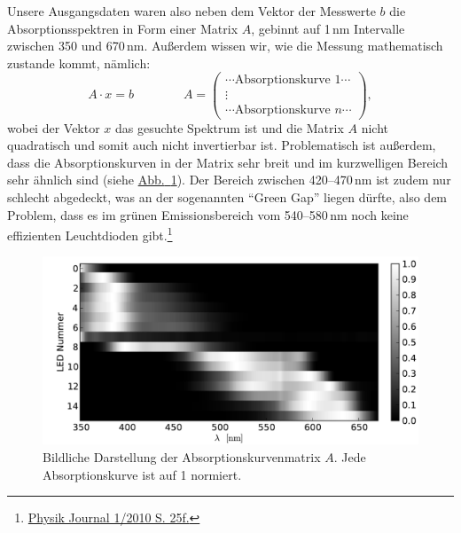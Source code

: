\documentclass[11pt]{scrartcl}
\newcommand{\hypref}[2]{\hyperref[#2]{{#1}~\ref{#2}}}
\begin{document}
Unsere Ausgangsdaten waren also neben dem Vektor der Messwerte $b$ die Absorptionsspektren in Form einer Matrix $A$, gebinnt auf 1\,nm Intervalle zwischen 350 und 670\,nm. Außerdem wissen wir, wie die Messung mathematisch zustande kommt, nämlich:
\begin{equation}
A\cdot x = b
\qquad\qquad
A =
\begin{pmatrix}
\cdots \text{Absorptionskurve 1} \cdots \\
\vdots \\
\cdots \text{Absorptionskurve $n$} \cdots
\end{pmatrix},
\end{equation}
wobei der Vektor $x$ das gesuchte Spektrum ist und die Matrix $A$ nicht quadratisch und somit auch nicht invertierbar ist.
Problematisch ist außerdem, dass die Absorptionskurven in der Matrix sehr breit und im kurzwelligen Bereich sehr ähnlich sind (siehe \hypref{Abb.}{fig:matrixA}).
Der Bereich zwischen 420--470\,nm ist zudem nur schlecht abgedeckt, was an der sogenannten "`Green Gap"' liegen dürfte, also dem Problem, dass es im grünen Emissionsbereich vom 540--580\,nm noch keine effizienten Leuchtdioden gibt.\footnote{\href{http://www.pro-physik.de/Phy/pdfstart.do?mid=3&articleid=51055&recordid=51193}{Physik Journal 1/2010 S. 25f.}}

\begin{figure}[ht]
\begin{center}
\includegraphics[width=1\textwidth]{matrix_A.pdf}
\end{center}
\vspace{-1.5\baselineskip}
\caption{Bildliche Darstellung der Absorptionskurvenmatrix $A$. Jede Absorptionskurve ist auf 1 normiert.}
\label{fig:matrixA}
\end{figure}
\end{document}
